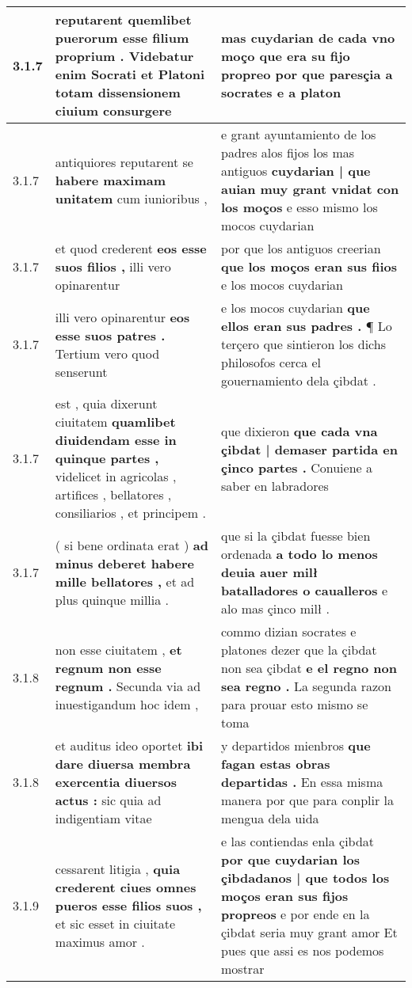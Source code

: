 \begin{tabular}{|p{1cm}|p{6.5cm}|p{6.5cm}|}
3.1.7 & reputarent \textbf{ quemlibet puerorum esse filium proprium . } Videbatur enim Socrati et Platoni totam dissensionem ciuium consurgere & mas cuydarian de cada vno moço \textbf{ que era su fijo propreo } por que paresçia a socrates e a platon \\\hline
3.1.7 & antiquiores reputarent se \textbf{ habere maximam unitatem } cum iunioribus , & e grant ayuntamiento de los padres alos fijos los mas antiguos \textbf{ cuydarian | que auian muy grant vnidat con los moços } e esso mismo los mocos cuydarian \\\hline
3.1.7 & et quod crederent \textbf{ eos esse suos filios , } illi vero opinarentur & por que los antiguos creerian \textbf{ que los moços eran sus fiios } e los mocos cuydarian \\\hline
3.1.7 & illi vero opinarentur \textbf{ eos esse suos patres . } Tertium vero quod senserunt & e los mocos cuydarian \textbf{ que ellos eran sus padres . } ¶ Lo terçero que sintieron los dichs philosofos cerca el gouernamiento dela çibdat . \\\hline
3.1.7 & est , quia dixerunt ciuitatem \textbf{ quamlibet diuidendam esse in quinque partes , } videlicet in agricolas , artifices , bellatores , consiliarios , et principem . & que dixieron \textbf{ que cada vna çibdat | demaser partida en çinco partes . } Conuiene a saber en labradores \\\hline
3.1.7 & ( si bene ordinata erat ) \textbf{ ad minus deberet habere mille bellatores , } et ad plus quinque millia . & que si la çibdat fuesse bien ordenada \textbf{ a todo lo menos deuia auer milł batalladores o caualleros } e alo mas çinco milł . \\\hline
3.1.8 & non esse ciuitatem , \textbf{ et regnum non esse regnum . } Secunda via ad inuestigandum hoc idem , & commo dizian socrates e platones dezer que la çibdat non sea çibdat \textbf{ e el regno non sea regno . } La segunda razon para prouar esto mismo se toma \\\hline
3.1.8 & et auditus ideo oportet \textbf{ ibi dare diuersa membra exercentia diuersos actus : } sic quia ad indigentiam vitae & y departidos mienbros \textbf{ que fagan estas obras departidas . } En essa misma manera por que para conplir la mengua dela uida \\\hline
3.1.9 & cessarent litigia , \textbf{ quia crederent ciues omnes pueros esse filios suos , } et sic esset in ciuitate maximus amor . & e las contiendas enla çibdat \textbf{ por que cuydarian los çibdadanos | que todos los moços eran sus fijos propreos } e por ende en la çibdat seria muy grant amor Et pues que assi es nos podemos mostrar \\\hline

\end{tabular}

